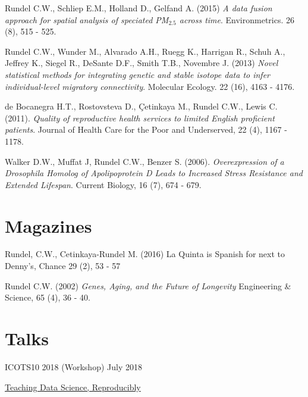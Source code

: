 \documentclass[margin,line]{res}
\begin{document}
\begin{resume}
\vspace{-0.15cm}
Rundel C.W., Schliep E.M., Holland D., Gelfand A. (2015) {\em A data fusion approach for spatial analysis of speciated PM$_{2.5}$ across time}. Environmetrics. 26 (8), 515 - 525.

\vspace{-0.15cm}
Rundel C.W., Wunder M., Alvarado A.H., Ruegg K., Harrigan R., Schuh A., Jeffrey K., Siegel R., DeSante D.F., Smith T.B., Novembre J. (2013) {\em Novel statistical methods for integrating genetic and stable isotope data to infer individual-level migratory connectivity}. Molecular Ecology. 22 (16), 4163 - 4176.

\vspace{-0.15cm}
de Bocanegra H.T., Rostovsteva D., \c{C}etinkaya M., Rundel C.W., Lewis C. (2011). {\em Quality of reproductive health services to limited English proficient patients}. Journal of Health Care for the Poor and Underserved, 22 (4), 1167 - 1178.

\vspace{-0.15cm}
Walker D.W., Muffat J, Rundel C.W., Benzer S. (2006). {\em Overexpression of a Drosophila Homolog of Apolipoprotein D Leads to Increased Stress Resistance and Extended Lifespan}. Current Biology, 16 (7), 674 - 679.


\vspace{4mm}

%

\section{\sc Magazines}

Rundel, C.W., Cetinkaya-Rundel M. (2016) La Quinta is Spanish for next to Denny's, Chance 29 (2), 53 - 57


Rundel C.W. (2002) {\em Genes, Aging, and the Future of Longevity} Engineering \& Science, 65 (4), 36 - 40.

\vspace{4mm}

%

\section{\sc Talks}

ICOTS10 2018 (Workshop) \hfill July 2018
\begin{list1}
\item[] \href{https://mine-cetinkaya-rundel.github.io/teach-data-sci-icots2018/}{Teaching Data Science, Reproducibly}
\end{list1}
\vspace{-2mm}


\end{resume}
\end{document}
